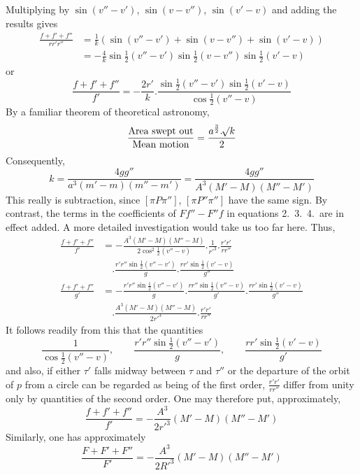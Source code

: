 Multiplying by $\sin(v''-v')$, $\sin(v-v'')$, $\sin(v'-v)$ and adding the results gives
\[
\begin{aligned}
\frac{f+f'+f''}{rr'r''}&=\frac1k(\sin(v''-v')+\sin(v-v'')+\sin(v'-v))\\
&=-\frac4k\sin\tfrac12(v''-v')\sin\tfrac12(v-v'')\sin\tfrac12(v'-v)
\end{aligned}
\]
or
\[
\frac{f+f'+f''}{f'}=-\frac{2r'}k.\frac{\sin\tfrac12(v''-v')\sin\tfrac12(v'-v)}{\cos\tfrac12(v''-v)}
\]
By a familiar theorem of theoretical astronomy,
\[
\frac{\text{Area swept out}}{\text{Mean motion}}=\frac{a^{\frac32}.\mathord{{}^{}\!\surd}k}2
\]
Consequently,
\[
k=\frac{4gg''}{a^3(m'-m)(m''-m')}=\frac{4gg''}{A^3(M'-M)(M''-M')}
\]
%
\expandafter\def\csname HistoricalNoteText11\endcsname{This really is subtraction, since $[\pi P\pi'']$, $[\pi P''\pi'']$ have the same sign. By contrast, the terms in the coefficients of $Ff''-F''f$ in equations 2.\ 3.\ 4.\ are in effect added. A more detailed investigation would take us too far here.}%
Thus,
\[
\begin{aligned}
\frac{f+f'+f''}{f'}&=-\frac{A^3(M'-M)(M''-M)}{2\cos^2\tfrac12(v''-v)}.\frac1{r'^3}.\frac{r'r'}{rr''}\\&\quad.\frac{r'r''\sin\tfrac12(v''-v')}{g}.\frac{rr'\sin\tfrac12(v'-v)}{g''}\\
\frac{f+f'+f''}{g'}&=-\frac{r'r''\sin\tfrac12(v''-v')}{g}.\frac{rr''\sin\tfrac12(v''-v)}{g'}.\frac{rr'\sin\tfrac12(v'-v)}{g''}\\&\quad.\frac{A^3(M'-M)(M''-M)}{2r'^3}.\frac{r'r'}{rr''}
\end{aligned}
\]
It follows readily from this that the quantities
\[
\frac1{\cos\tfrac12(v''-v)},\qquad\frac{r'r''\sin\tfrac12(v''-v')}{g},\qquad\frac{rr'\sin\tfrac12(v'-v)}{g'}
\]
and also, if either $\tau'$ falls midway between $\tau$ and $\tau''$ or the departure of the orbit of $p$ from a circle can be regarded as being of the first order, $\frac{r'r'}{rr''}$ differ from unity only by quantities of the second order. One may therefore put, approximately,
\[
\frac{f+f'+f''}{f'}=-\frac{A^3}{2r'^3}(M'-M)(M''-M')
\]
Similarly, one has approximately
\[
\frac{F+F'+F''}{F'}=-\frac{A^3}{2R'^3}(M'-M)(M''-M')
\]

